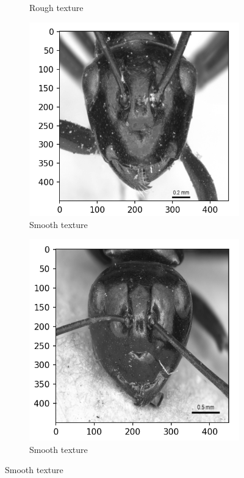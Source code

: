 \documentclass{aci}
\numberwithin{equation}{section}
\begin{document}
\begin{figure}
\begin{subfigure}{\segmentedsubwidth}
        \caption*{Rough texture}
    \end{subfigure}
    \begin{subfigure}{\segmentedsubwidth}
        \includegraphics[width=1\linewidth]{figs/s105.png}
        \caption*{Smooth texture}
    \end{subfigure}
    \begin{subfigure}{\segmentedsubwidth}
        \includegraphics[width=1\linewidth]{figs/s107.png}
        \caption*{Smooth texture}
    \end{subfigure}


\end{figure}
\end{document}
